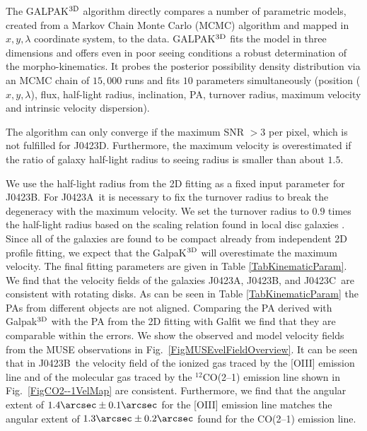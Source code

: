 \documentclass[a4paper,fleqn,usenatbib]{mnras}
\newcommand{\GalA}{J0423A}
\newcommand{\GalB}{J0423B}
\newcommand{\GalC}{J0423C}
\newcommand{\GalD}{J0423D}
\begin{document}
{The GALPAK$^{\rm 3D}$ algorithm directly compares a number of parametric models, created from a Markov Chain Monte Carlo (MCMC) algorithm and mapped in $x, y, \lambda$ coordinate system, to the data. 
GALPAK$^{\rm 3D}$ fits the model in three dimensions and offers even in poor seeing conditions a robust determination of the morpho-kinematics. It probes the posterior possibility density distribution via an MCMC chain of $15,000$ runs and fits $10$ parameters simultaneously (position ($x, y, \lambda$), flux, half-light radius, inclination, PA, turnover radius, maximum velocity and intrinsic velocity dispersion).

The algorithm can only converge if the maximum SNR $> 3$ per pixel, which is not fulfilled for \GalD. Furthermore, the maximum velocity is overestimated if the ratio of galaxy half-light radius to seeing radius is smaller than about $1.5$.

We use the half-light radius from the 2D fitting as a fixed input parameter for \GalB. For \GalA\ it is necessary to fix the turnover radius to break the degeneracy with the maximum velocity. We set the turnover radius to $0.9$ times the half-light radius based on the scaling relation found in local disc galaxies \citep{Amorisco2010self}. Since all of the galaxies are found to be compact already from independent 2D profile fitting, we expect that the GalpaK$^{\rm 3D}$ will overestimate the maximum velocity. The final fitting parameters are given in Table \ref{TabKinematicParam}. We find that the velocity fields of the galaxies \GalA, \GalB, and \GalC\ are consistent with rotating disks. As can be seen in Table \ref{TabKinematicParam} the PAs from different objects are not aligned. Comparing the PA derived with Galpak$^{\rm 3D}$ with the PA from the 2D fitting with {\sc Galfit} we find that they are comparable within the errors. %
We show the observed and model velocity fields from the MUSE observations in Fig.~\ref{FigMUSEvelFieldOverview}. It can be seen that in \GalB\ the velocity field of the ionized gas traced by the [OIII] emission line and of the molecular gas traced by the $^{12}$CO(2--1) emission line shown in Fig.~\ref{FigCO2--1VelMap} are consistent. Furthermore, we find that the angular extent of $1.4\arcsec \pm 0.1\arcsec$ for the [OIII] emission line matches the angular extent of $1.3\arcsec \pm 0.2\arcsec$ found for the CO(2--1) emission line.\\


}
\end{document}

